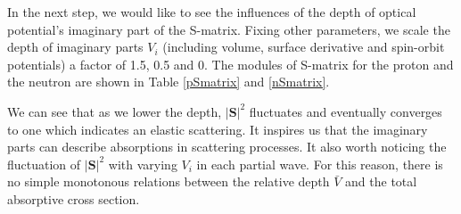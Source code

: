 	In the next step, we would like to see the influences of the depth of optical potential's imaginary part of the S-matrix. 
	Fixing other parameters, we scale the depth of imaginary parts $V_i$ (including volume, surface derivative and spin-orbit potentials) a factor of 1.5, 0.5 and 0. 
	The modules of S-matrix for the proton and the neutron are shown in Table \ref{pSmatrix} and \ref{nSmatrix}. 
	
	We can see that as we lower the depth, $|\mathbf{S}|^2$ fluctuates and eventually converges to one which indicates an elastic scattering. It inspires us that the imaginary parts can describe absorptions in scattering processes. It also worth noticing the fluctuation of $|\mathbf{S}|^2$ with varying $V_i$ in each partial wave. For this reason, there is no simple monotonous relations between the relative depth $\bar{V}$ and the total absorptive cross section.

